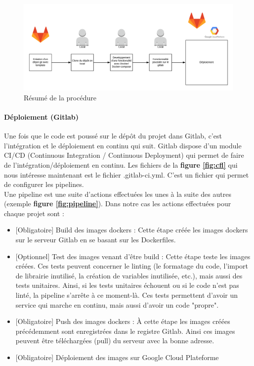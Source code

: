 \documentclass{article} %
\begin{document}
\begin{figure}[!h]
 \centering
 \includegraphics[keepaspectratio = true,scale=0.6]{resume.png}
 \caption{Résumé de la procédure}
 \label{fig:ress}
\end{figure}


\paragraph{Déploiement (Gitlab)\\}
Une fois que le code est poussé sur le dépôt du projet dans Gitlab, c'est l'intégration et le déploiement en continu qui suit. Gitlab dispose d'un module CI/CD (Continuous Integration / Continuous Deployment) qui permet de faire de l'intégration/déploiement en continu. Les fichiers de la \textbf{figure \ref{fig:cfl}} qui nous intéresse maintenant est le fichier .gitlab-ci.yml. C'est un fichier qui permet de configurer les pipelines.\\
Une pipeline est une suite d'actions effectuées les unes à la suite des autres (exemple \textbf{figure \ref{fig:pipeline}}). Dans notre cas les actions effectuées pour chaque projet sont : 
\begin{itemize}
 \item {[Obligatoire]} Build des images dockers : Cette étape créée les images dockers sur le serveur Gitlab en se basant sur les Dockerfiles.
 \item {[Optionnel]} Test des images venant d'être build : Cette étape teste les images créées. Ces tests peuvent concerner le linting (le formatage du code, l'import de librairie inutilisé, la création de variables inutilisée, etc.), mais aussi des tests unitaires. Ainsi, si les tests unitaires échouent ou si le code n'est pas linté, la pipeline s'arrête à ce moment-là. Ces tests permettent d'avoir un service qui marche en continu, mais aussi d'avoir un code "propre".
 \item {[Obligatoire]} Push des images dockers : À cette étape les images créées précédemment sont enregistrées dans le registre Gitlab. Ainsi ces images peuvent être téléchargées (pull) du serveur avec la bonne adresse. 
 \item {[Obligatoire]} Déploiement des images sur Google Cloud Plateforme 
\end{itemize}
\end{document}
